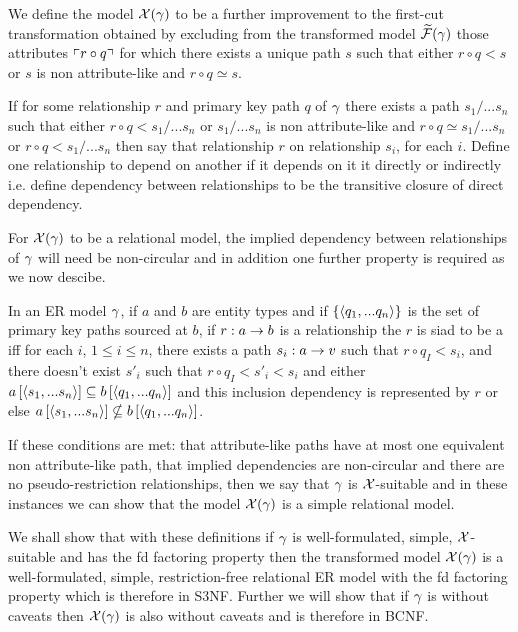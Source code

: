 We define the model $\mathcal{X}(\gamma)$ to be a further improvement to the first-cut transformation obtained by excluding  from  the transformed model $\mathcal{\widetilde{F}}(\gamma)$ those attributes $\left\ulcorner r \circ q\right\urcorner$ for which there exists a unique  path $s$ such that  either  $r \circ q < s$ or $s$ is non attribute-like and $r \circ q \simeq s$. 

\begin{definition}
If for some relationship $r$ and primary key path $q$ of $\gamma$ there exists a  path $s_1/...s_n$ such that either   $r \circ q < s_1/...s_n$ or $s_1/...s_n$ is non attribute-like and $r \circ q \simeq s_1/...s_n$ or $r \circ q < s_1/...s_n$ then say that relationship $r$  on relationship $s_i$,
for each $i$. Define one relationship to depend on another if it depends on it it directly or indirectly i.e. define dependency between relationships to be the transitive closure of direct dependency.
\end{definition}

For $\mathcal{X}(\gamma)$ to be a relational model, the implied dependency between relationships of $\gamma$ will need be non-circular
and in addition one further property is required as we now descibe.


\begin{definition}
In an  ER model $\gamma$, if $a$ and $b$ are entity types and if $\left\{\langle q_1,...q_n\rangle\right\}$ is the set of primary key paths sourced at $b$, if $r: a \rightarrow b$ is a relationship the $r$ is siad to be a 
iff for each $i$, $1 \leq i \leq n$, there exists a path $s_i: a \rightarrow v$ such that $r \circ q_I < s_i$,
and there doesn't exist $s'_i$ such that $r \circ q_I < s'_i <s_i$ and  either
$a\left[\langle s_1,...s_n\rangle\right]\subseteq b\left[\langle q_1,...q_n\rangle\right]$ and this inclusion dependency is represented by
$r$ or else $a\left[\langle s_1,...s_n\rangle\right]\nsubseteq b\left[\langle q_1,...q_n\rangle\right]$.
\end{definition}


If these conditions are met: that attribute-like paths have at most one equivalent non attribute-like path, that implied dependencies are non-circular and there are no pseudo-restriction relationships, then we say that $\gamma$ is $\mathcal{X}$-suitable and in these instances we can show that 
the model $\mathcal{X}(\gamma)$ is a simple relational model. 

We shall show that with these definitions if $\gamma$ is well-formulated, simple, $\mathcal{X}$-suitable and has the fd factoring property
then the transformed model $\mathcal{X}(\gamma)$ is a well-formulated, simple, restriction-free relational ER model with the fd factoring property which is therefore in S3NF.  Further we will show that if $\gamma$ is without caveats then $\mathcal{X}(\gamma)$ is also without caveats and is therefore in BCNF. 

